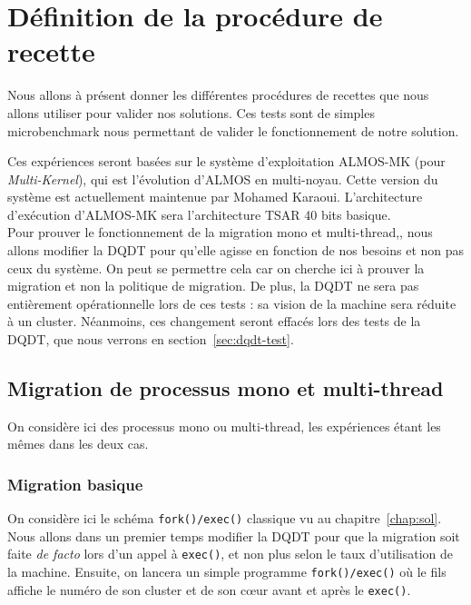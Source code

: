 \chapter{Définition de la procédure de recette}
\label{chap:tests}

  Nous allons à présent donner les différentes procédures de recettes que nous
  allons utiliser pour valider nos solutions. Ces tests sont de simples
  microbenchmark nous permettant de valider le fonctionnement de notre solution.

  Ces expériences seront basées sur le système d'exploitation ALMOS-MK (pour
  \textit{Multi-Kernel}), qui est l'évolution d'ALMOS en multi-noyau. Cette
  version du système est actuellement maintenue par Mohamed
  Karaoui. L'architecture d'exécution d'ALMOS-MK sera l'architecture TSAR 40
  bits basique.\\

  Pour prouver le fonctionnement de la migration mono et multi-thread,, nous
  allons modifier la DQDT pour qu'elle agisse en fonction de nos besoins et non
  pas ceux du système. On peut se permettre cela car on cherche ici à prouver la
  migration et non la politique de migration. De plus, la DQDT ne sera pas
  entièrement opérationnelle lors de ces tests : sa vision de la machine sera
  réduite à un cluster. Néanmoins, ces changement seront effacés lors des tests
  de la DQDT, que nous verrons en section~\ref{sec:dqdt-test}.

  \section{Migration de processus mono et multi-thread}

    On considère ici des processus mono ou multi-thread, les expériences étant
    les mêmes dans les deux cas.

    \subsection{Migration basique}

      On considère ici le schéma \texttt{fork()/exec()} classique vu au
      chapitre~\ref{chap:sol}. Nous allons dans un premier temps modifier la
      DQDT pour que la migration soit faite \textit{de facto} lors d'un appel à
      \texttt{exec()}, et non plus selon le taux d'utilisation de la
      machine. Ensuite, on lancera un simple programme \texttt{fork()/exec()} où
      le fils affiche le numéro de son cluster et de son c\oe ur avant et après
      le \texttt{exec()}.

